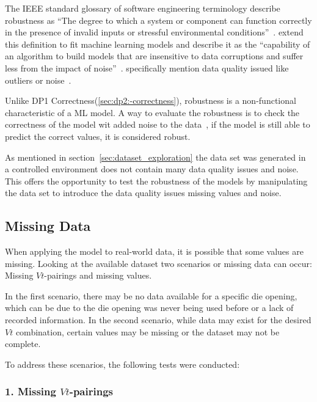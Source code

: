 The IEEE standard glossary of software engineering terminology describe robustness as ``The degree
to which a system or component can function correctly in the presence of invalid inputs or
stressful environmental conditions''~\cite[p. 64]{terminology1990ieee}.
\cite{saez2016evaluating} extend this definition to fit machine learning models and describe it
as the ``capability of an algorithm to build models that are insensitive to data corruptions and
suffer less from the impact of noise''~\cite[p. 2]{saez_evaluatingclassifierbehavior_2016}.
\cite{siebert2022construction} specifically mention data quality issued like outliers or
noise~\cite[p. 16]{siebert2022construction}.

Unlike DP1 Correctness(\ref{sec:dp2:-correctness}), robustness is a non-functional characteristic
of a \ac{ML} model.
A way to evaluate the robustness is to check the correctness of the model wit
added noise to the data~\cite[p. 18]{zhou_machinelearning_2021}, if the model is still able to
predict the correct values, it is considered robust.

As mentioned in section~\ref{sec:dataset_exploration} the data set
was generated in a controlled environment does not contain many data quality issues and noise.
This offers the opportunity to test the robustness of the models by manipulating the data set
to introduce the data quality issues missing values and noise.

\subsection{Missing Data}\label{subsec:missing-data}
When applying the model to real-world data, it is possible that some values are missing.
Looking at the available dataset two scenarios or missing data can occur: Missing $Vt$-pairings
and missing values.

In the first scenario, there may be no data available for a specific die
opening, which can be due to the die opening was never being used before or a lack of recorded
information.
In the second scenario, while data may exist for the desired $Vt$ combination, certain values may
be missing or the dataset may not be complete.


To address these scenarios, the following tests were conducted:

\subsubsection*{1. Missing $Vt$-pairings}

